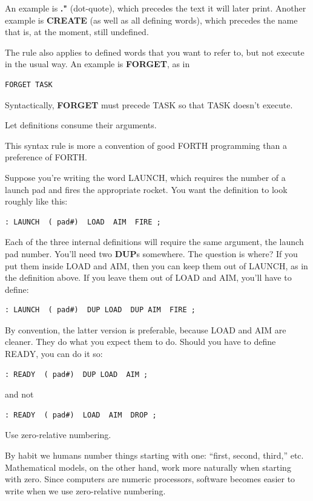 An example is \textbf{."} (dot-quote), which precedes the text it will later
print. Another example is \textbf{CREATE} (as well as all defining words), which
precedes the name that is, at the moment, still undefined.

The rule also applies to defined words that you want to refer to, but
not execute in the usual way. An example is \textbf{FORGET}, as in

\begin{verbatim}
FORGET TASK
\end{verbatim}

Syntactically, \textbf{FORGET} must precede TASK so that TASK doesn't
execute.
\begin{tip}
Let definitions consume their arguments.
\end{tip}
This syntax rule is more a convention of good FORTH programming
than a preference of FORTH.

Suppose you're writing the word LAUNCH, which requires the
number of a launch pad and fires the appropriate rocket. You want the
definition to look roughly like this:
\begin{verbatim}
: LAUNCH  ( pad#)  LOAD  AIM  FIRE ;
\end{verbatim}
Each of the three internal definitions will require the same argument, the
launch pad number. You'll need two \textbf{DUP}s somewhere. The question is
where? If you put them inside LOAD and AIM, then you can keep them
out of LAUNCH, as in the definition above. If you leave them out of
LOAD and AIM, you'll have to define:
\begin{verbatim}
: LAUNCH  ( pad#)  DUP LOAD  DUP AIM  FIRE ;
\end{verbatim}
By convention, the latter version is preferable, because LOAD and AIM
are cleaner. They do what you expect them to do. Should you have to
define READY, you can do it so:
\begin{verbatim}
: READY  ( pad#)  DUP LOAD  AIM ;
\end{verbatim}
and not
\begin{verbatim}
: READY  ( pad#)  LOAD  AIM  DROP ;
\end{verbatim}
\begin{tip}
Use zero-relative numbering.
\end{tip}
By habit we humans number things starting with one: ``first, second,
third,'' etc. Mathematical models, on the other hand, work more naturally
when starting with zero. Since computers are numeric processors, software
becomes easier to write when we use zero-relative numbering.

